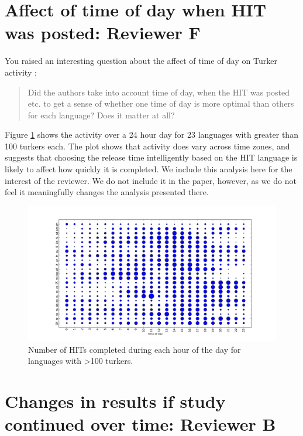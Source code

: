 \documentclass[11pt]{article}
\begin{document}
\section{Affect of time of day when HIT was posted: Reviewer F}

You raised an interesting question about the affect of time of day on Turker activity : 

\begin{quote}
Did the authors take into account time of day, when the HIT was posted etc. to get a sense of whether one time of day is more optimal than others for each language? Does it matter at all?
\end{quote}
Figure \ref{time} shows the activity over a 24 hour day for 23 languages with greater than 100 turkers each. The plot shows that activity does vary across time zones, and suggests that choosing the release time intelligently based on the HIT language is likely to affect how quickly it is completed. We include this analysis here for the interest of the reviewer. We do not include it in the paper, however, as we do not feel it meaningfully changes the analysis presented there. 

\begin{figure}
\centering
\includegraphics[height=.8\linewidth, angle=270]{figures/times.png}
\caption{Number of HITs completed during each hour of the day for languages with \textgreater 100 turkers.}
\label{time}
\end{figure}

\section{Changes in results if study continued over time: Reviewer B}
\end{document}
